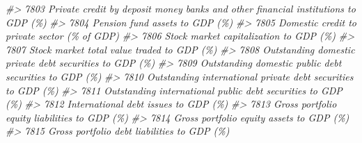 \documentclass[
]{bxjsbook}
\newenvironment{Shaded}{\begin{snugshade}}{\end{snugshade}}
\newcommand{\CommentTok}[1]{\textcolor[rgb]{0.56,0.35,0.01}{\textit{#1}}}
\theoremstyle{definition}
\theoremstyle{definition}
\theoremstyle{definition}
\theoremstyle{definition}
\theoremstyle{remark}
\begin{document}
\begin{Shaded}
\begin{Highlighting}[]
\CommentTok{\#\textgreater{} 7803                                                                                          Private credit by deposit money banks and other financial institutions to GDP (\%)}
\CommentTok{\#\textgreater{} 7804                                                                                                                                             Pension fund assets to GDP (\%)}
\CommentTok{\#\textgreater{} 7805                                                                                                                               Domestic credit to private sector (\% of GDP)}
\CommentTok{\#\textgreater{} 7806                                                                                                                                     Stock market capitalization to GDP (\%)}
\CommentTok{\#\textgreater{} 7807                                                                                                                                 Stock market total value traded to GDP (\%)}
\CommentTok{\#\textgreater{} 7808                                                                                                                    Outstanding domestic private debt securities to GDP (\%)}
\CommentTok{\#\textgreater{} 7809                                                                                                                     Outstanding domestic public debt securities to GDP (\%)}
\CommentTok{\#\textgreater{} 7810                                                                                                               Outstanding international private debt securities to GDP (\%)}
\CommentTok{\#\textgreater{} 7811                                                                                                                Outstanding international public debt securities to GDP (\%)}
\CommentTok{\#\textgreater{} 7812                                                                                                                                       International debt issues to GDP (\%)}
\CommentTok{\#\textgreater{} 7813                                                                                                                              Gross portfolio equity liabilities to GDP (\%)}
\CommentTok{\#\textgreater{} 7814                                                                                                                                   Gross portfolio equity assets to GDP (\%)}
\CommentTok{\#\textgreater{} 7815                                                                                                                                Gross portfolio debt liabilities to GDP (\%)}

\end{Highlighting}
\end{Shaded}
\end{document}
